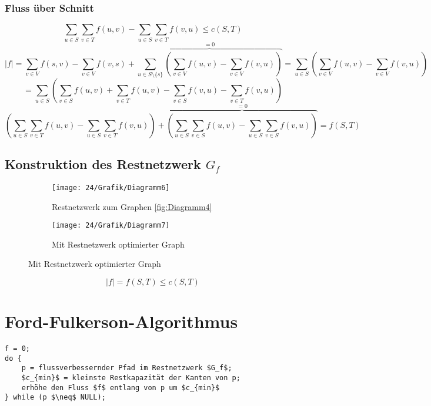 \subsubsection{Fluss über Schnitt}
\[ \sum_{u\in S}\sum_{v\in T} f(u,v) - \sum_{u\in S}\sum_{v\in T} f(v,u) \leq c(S,T) \]
\vspace{40pt}
\[ |f| = \sum_{v\in V} f(s,v) - \sum_{v \in V}f(v,s)+\overset{=0}{\overbrace{\sum_{u\in S\setminus\{ s \}} \left( \sum_{v\in V} f(u,v) - \sum_{v \in V} f(v,u) \right)   }} = \sum_{u \in S} \left(\sum_{v\in V}f(u,v)-\sum_{v \in V}f(v,u)   \right) \]
\[ =\sum_{u \in S}\left(  \sum_{v\in S} f(u,v)+\sum_{v\in T}f(u,v) - \sum_{v \in S}f(v,u)- \sum_{v\in T}f(v,u)  \right) \]
\[ \left( \sum_{u\in S}\sum_{v\in T} f(u,v) -\sum_{u\in S}\sum_{v\in T} f(v,u)  \right) + \overset{=0}{\overbrace{\left(  \sum_{u\in S}\sum_{v\in S}f(u,v) - \sum_{u\in S}\sum_{v\in S} f(v,u) \right)} } = f(S,T)\]
\subsection{Konstruktion des Restnetzwerk $G_f$}
\begin{figure}[H]
\centering
\begin{subfigure}[H]{0.3\linewidth}
\texttt{[image: 24/Grafik/Diagramm6]}
\caption{Restnetzwerk zum Graphen \ref{fig:Diagramm4}}
\end{subfigure}
\begin{subfigure}[H]{0.3\linewidth}
\texttt{[image: 24/Grafik/Diagramm7]}
\caption{Mit Restnetzwerk optimierter Graph}
\end{subfigure}	
\label{fig:Diagramm6}
\end{figure}
\[ |f| = f(S,T) \leq c(S,T) \]
\section{Ford-Fulkerson-Algorithmus}
\begin{lstlisting}
f = 0;
do {
	p = flussverbessernder Pfad im Restnetzwerk $G_f$;
	$c_{min}$ = kleinste Restkapazität der Kanten von p;
	erhöhe den Fluss $f$ entlang von p um $c_{min}$
} while (p $\neq$ NULL);
\end{lstlisting}